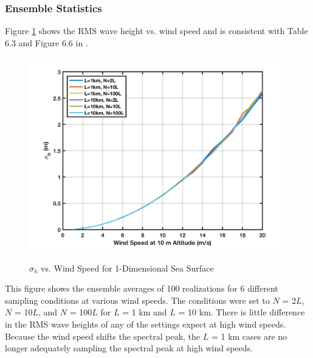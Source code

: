 \subsubsection{Ensemble Statistics}
Figure \ref{os_fig:7fff} shows the RMS wave height vs. wind speed and is consistent with Table 6.3 and Figure 6.6 in \cite{temper_guide}.
\begin{figure}[H]
  \begin{center}
\includegraphics[width=6in]{../media/Ocean_Surface/1d_ensemble_rms.png}
  \end{center}
  \renewcommand{\baselinestretch}{1} \small\normalsize
  \begin{quote}
    \caption[$\sigma_h$ vs. Wind Speed for 1-Dimensional Sea Surface]{$\sigma_h$ vs. Wind Speed for 1-Dimensional Sea Surface\label{os_fig:7fff}}
  \end{quote}
\end{figure}
\renewcommand{\baselinestretch}{2} \small\normalsize
This figure shows the ensemble averages of 100 realizations for 6 different sampling conditions at various wind speeds. The conditions were set to $N$ = 2$L$, $N$ = 10$L$, and $N$ = 100$L$ for $L$ = 1 km and $L$ = 10 km. There is little difference in the RMS wave heights of any of the settings expect at high wind speeds. Because the wind speed shifts the spectral peak, the $L$ = 1 km cases are no longer adequately sampling the spectral peak at high wind speeds.

